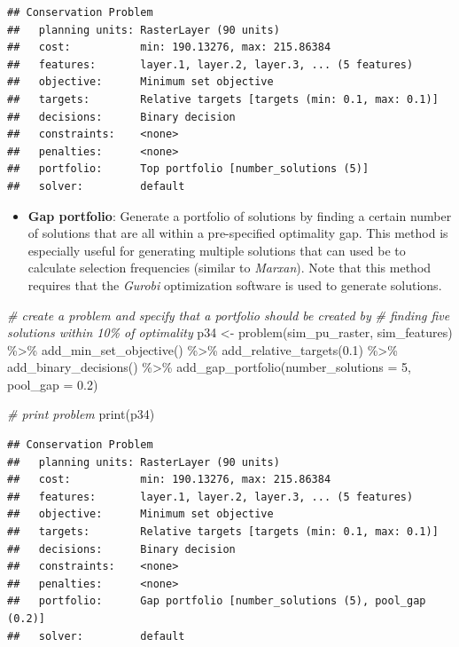\documentclass[
  12pt,
]{book}
\newenvironment{Shaded}{\begin{snugshade}}{\end{snugshade}}
\newcommand{\AttributeTok}[1]{\textcolor[rgb]{0.77,0.63,0.00}{#1}}
\newcommand{\CommentTok}[1]{\textcolor[rgb]{0.56,0.35,0.01}{\textit{#1}}}
\newcommand{\DecValTok}[1]{\textcolor[rgb]{0.00,0.00,0.81}{#1}}
\newcommand{\FloatTok}[1]{\textcolor[rgb]{0.00,0.00,0.81}{#1}}
\newcommand{\FunctionTok}[1]{\textcolor[rgb]{0.00,0.00,0.00}{#1}}
\newcommand{\NormalTok}[1]{#1}
\newcommand{\OtherTok}[1]{\textcolor[rgb]{0.56,0.35,0.01}{#1}}
\newcommand{\SpecialCharTok}[1]{\textcolor[rgb]{0.00,0.00,0.00}{#1}}
\providecommand{\tightlist}{%
  \setlength{\itemsep}{0pt}\setlength{\parskip}{0pt}}
\begin{document}
\begin{verbatim}
## Conservation Problem
##   planning units: RasterLayer (90 units)
##   cost:           min: 190.13276, max: 215.86384
##   features:       layer.1, layer.2, layer.3, ... (5 features)
##   objective:      Minimum set objective 
##   targets:        Relative targets [targets (min: 0.1, max: 0.1)]
##   decisions:      Binary decision 
##   constraints:    <none>
##   penalties:      <none>
##   portfolio:      Top portfolio [number_solutions (5)]
##   solver:         default
\end{verbatim}

\begin{itemize}
\tightlist
\item
  \textbf{Gap portfolio}: Generate a portfolio of solutions by finding a certain number of solutions that are all within a pre-specified optimality gap. This method is especially useful for generating multiple solutions that can used be to calculate selection frequencies (similar to \emph{Marxan}). Note that this method requires that the \emph{Gurobi} optimization software is used to generate solutions.
\end{itemize}

\begin{Shaded}
\begin{Highlighting}[]
\CommentTok{\# create a problem and specify that a portfolio should be created by}
\CommentTok{\# finding five solutions within 10\% of optimality}
\NormalTok{p34 }\OtherTok{\textless{}{-}} \FunctionTok{problem}\NormalTok{(sim\_pu\_raster, sim\_features) }\SpecialCharTok{\%\textgreater{}\%}
       \FunctionTok{add\_min\_set\_objective}\NormalTok{() }\SpecialCharTok{\%\textgreater{}\%}
       \FunctionTok{add\_relative\_targets}\NormalTok{(}\FloatTok{0.1}\NormalTok{) }\SpecialCharTok{\%\textgreater{}\%}
       \FunctionTok{add\_binary\_decisions}\NormalTok{() }\SpecialCharTok{\%\textgreater{}\%}
       \FunctionTok{add\_gap\_portfolio}\NormalTok{(}\AttributeTok{number\_solutions =} \DecValTok{5}\NormalTok{, }\AttributeTok{pool\_gap =} \FloatTok{0.2}\NormalTok{)}

\CommentTok{\# print problem}
\FunctionTok{print}\NormalTok{(p34)}
\end{Highlighting}
\end{Shaded}

\begin{verbatim}
## Conservation Problem
##   planning units: RasterLayer (90 units)
##   cost:           min: 190.13276, max: 215.86384
##   features:       layer.1, layer.2, layer.3, ... (5 features)
##   objective:      Minimum set objective 
##   targets:        Relative targets [targets (min: 0.1, max: 0.1)]
##   decisions:      Binary decision 
##   constraints:    <none>
##   penalties:      <none>
##   portfolio:      Gap portfolio [number_solutions (5), pool_gap (0.2)]
##   solver:         default
\end{verbatim}
\end{document}
